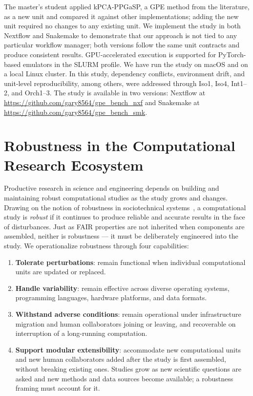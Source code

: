 \documentclass{eceasst}
\begin{document}
The master's student applied kPCA-PPGaSP, a GPE method from the literature, as a
new unit and compared it against other implementations; adding the new unit
required no changes to any existing unit.
We implement the study in both Nextflow and Snakemake to demonstrate that our
approach is not tied to any particular workflow manager; both versions follow
the same unit contracts and produce consistent results.
GPU-accelerated execution is supported for PyTorch-based emulators in the SLURM
profile.
We have run the study on macOS and on a local Linux cluster.
In this study, dependency conflicts, environment drift, and unit-level reproducibility, among others, were addressed through Iso1, Iso4, Int1--2, and Orch1--3.
The study is available in two versions: Nextflow at
\url{https://github.com/gary8564/gpe_bench_nxf} and Snakemake at
\url{https://github.com/gary8564/gpe_bench_smk}.


\section{Robustness in the Computational Research Ecosystem}
\label{sec:robustness}


Productive research in science and engineering depends on building and
maintaining robust computational studies as the study grows and changes. Drawing on the notion of robustness in sociotechnical systems~\cite{dlr79571},
a computational study is \emph{robust} if it continues to produce reliable and accurate
results in the face of disturbances. Just as FAIR
properties are not inherited when components are assembled, neither is robustness ---
it must be deliberately engineered into the study. We operationalize robustness through four capabilities:

\begin{enumerate}
  \item \textbf{Tolerate perturbations}: remain functional when individual
        computational units are updated or replaced.
  \item \textbf{Handle variability}: remain effective across diverse operating
        systems, programming languages, hardware platforms, and data formats.
  \item \textbf{Withstand adverse conditions}: remain operational under
        infrastructure migration and human collaborators joining or leaving, and recoverable on
        interruption of a long-running computation.
  \item \textbf{Support modular extensibility}: accommodate new computational
        units and new human collaborators added after the study is first assembled,
        without breaking existing ones. Studies grow as new scientific questions
        are asked and new methods and data sources become available; a robustness framing must account for it.
\end{enumerate}
\end{document}
